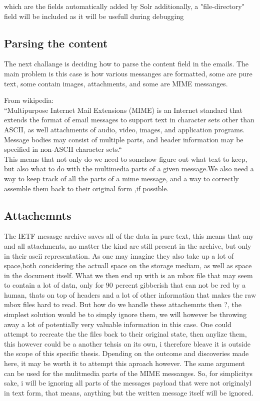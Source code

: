 \documentclass{report}
\begin{document}
which are the fields automatically added by Solr
additionally, a "file-directory" field will be included as it will be usefull during debugging

\subsection{Parsing the content}
The next challange is deciding how to parse the content field in the emails.
The main problem is this case is how various messanges are formatted, some are pure text, some contain images, attachments, and some are MIME messanges.

From wikipedia:\\
``Multipurpose Internet Mail Extensions (MIME) is an Internet standard that extends the format of email messages to support text in character sets other than ASCII, as well attachments of audio, video, images, and application programs. Message bodies may consist of multiple parts, and header information may be specified in non-ASCII character sets.``\\

This means that not only do we need to somehow figure out what text to keep, but also what to do with the multimedia parts of a given message.We also need  a way to keep track of all the parts of a mime message, and a way to correctly assemble them back to their original form ,if possible.

\subsection{Attachemnts}
The IETF mesasge archive saves all of the data in pure text, this means that any and all attachments, no matter the kind are still present in the archive, but only in their ascii representation. As one may imagine they also take up a lot of space,both concidering the actuall space on the storage mediam, as well as space in the document itself.
What we then end up with is an mbox file that may seem to contain a lot of datn, only for 90 percent  gibberish that can not be red by a human, thats on top of headers and a lot of other information that makes the raw mbox files hard to read.
But how do we handle these attachemnts then ?, the simplest solution would be to simply ignore them, we will however  be throwing away a lot of potentially very valuable information in this case. One could attempt to recreate the the files back to their original state, then anylize them, this however could be a another tehsis on its own, i therefore bleave it is 
outside the scope of this specific thesis. Dpending on the outcome and discoveries made here, it may be worth it to attempt this aproach however.
The same argument can be used for the mulitmedia parts of the MIME messanges.
So, for simplicitys sake, i will be ignoring all parts of the messages payload that were not originalyl in text form, that means, anything but the written message itself will be ignored.
\end{document}
